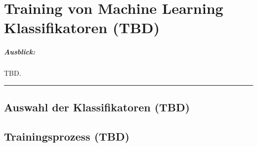 
\chapter{Training von Machine Learning Klassifikatoren (TBD)}

\paragraph{Ausblick:}
TBD.
\\
\hrule

\section{Auswahl der Klassifikatoren (TBD)}

\section{Trainingsprozess (TBD)}

\cleardoublepage